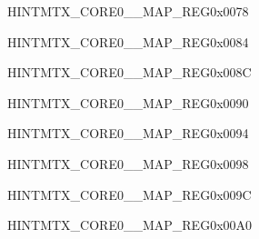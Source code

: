 \begin{register}{H}{INTMTX\_CORE0\_\_MAP\_REG}{0x0078}\label{regdesc:INTMTXCORE0GPIOINTERRUPTPROMAPREG}
\end{register}\vspace{-3em}






\begin{register}{H}{INTMTX\_CORE0\_\_MAP\_REG}{0x0084}\label{regdesc:INTMTXCORE0HPPERITIMEOUTINTRMAPREG}
\end{register}\vspace{-3em}


\begin{register}{H}{INTMTX\_CORE0\_\_MAP\_REG}{0x008C}\label{regdesc:INTMTXCORE0HPAPMM0INTRMAPREG}
\end{register}\vspace{-3em}


\begin{register}{H}{INTMTX\_CORE0\_\_MAP\_REG}{0x0090}\label{regdesc:INTMTXCORE0HPAPMM1INTRMAPREG}
\end{register}\vspace{-3em}


\begin{register}{H}{INTMTX\_CORE0\_\_MAP\_REG}{0x0094}\label{regdesc:INTMTXCORE0HPAPMM2INTRMAPREG}
\end{register}\vspace{-3em}


\begin{register}{H}{INTMTX\_CORE0\_\_MAP\_REG}{0x0098}\label{regdesc:INTMTXCORE0HPAPMM3INTRMAPREG}
\end{register}\vspace{-3em}


\begin{register}{H}{INTMTX\_CORE0\_\_MAP\_REG}{0x009C}\label{regdesc:INTMTXCORE0LPAPM0INTRMAPREG}
\end{register}\vspace{-3em}


\begin{register}{H}{INTMTX\_CORE0\_\_MAP\_REG}{0x00A0}\label{regdesc:INTMTXCORE0MSPIINTRMAPREG}
\end{register}\vspace{-3em}


